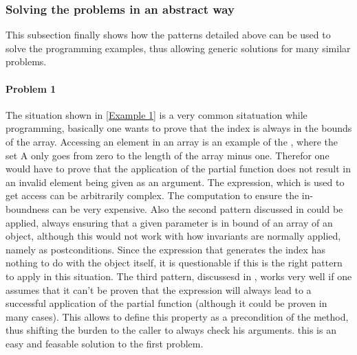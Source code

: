 \subsubsection{Solving the problems in an abstract way}
This subsection finally shows how the patterns detailed above can be used to solve the programming examples, thus allowing generic solutions for many similar problems.

\paragraph{Problem 1}
The situation shown in \ref{Example 1} is a very common sitatuation while programming, basically one wants to prove that the index is always in the bounds of the array. Accessing an element in an array is an example of the , where the set A only goes from zero to the length of the array minus one. Therefor one would have to prove that the application of the partial function does not result in an invalid element being given as an argument. The expression, which is used to get access can be arbitrarily complex. The computation to ensure the in-boundness can be very expensive.  \newline
Also the second pattern discussed in  could be applied, always ensuring that a given parameter is in bound of an array of an object, although this would not work with how invariants are normally applied, namely as postconditions. Since the expression that generates the index has nothing to do with the object itself, it is questionable if this is the right pattern to apply in this situation. \newline
The third pattern, discussesd in , works very well if one assumes that it can't be proven that the expression will always lead to a successful application of the partial function (although it could be proven in many cases). This allows to define this property as a precondition of the method, thus shifting the burden to the caller to always check his arguments. this is an easy and feasable solution to the first problem. 

